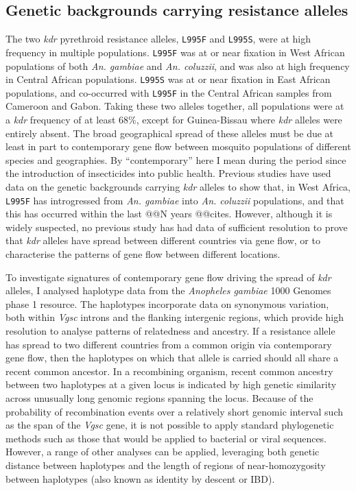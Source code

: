 \documentclass[a4paper,11pt,abstracton,hidelinks]{scrartcl}
\newcommand{\agam}{\textit{An. gambiae}\xspace}
\newcommand{\acol}{\textit{An. coluzzii}\xspace}
\newcommand{\vgsc}{\textit{Vgsc}\xspace}
\begin{document}
\subsection*{Genetic backgrounds carrying resistance alleles}


The two \textit{kdr} pyrethroid resistance alleles, \texttt{L995F} and \texttt{L995S}, were at high frequency in multiple populations.
%
\texttt{L995F} was at or near fixation in West African populations of both \agam and \acol, and was also at high frequency in Central African populations.
%
\texttt{L995S} was at or near fixation in East African populations, and co-occurred with \texttt{L995F} in the Central African samples from Cameroon and Gabon.
%
Taking these two alleles together, all populations were at a \textit{kdr} frequency of at least 68\%, except for Guinea-Bissau where \textit{kdr} alleles were entirely absent.
%
The broad geographical spread of these alleles must be due at least in part to contemporary gene flow between mosquito populations of different species and geographies.
%
By ``contemporary'' here I mean during the period since the introduction of insecticides into public health.
%
Previous studies have used data on the genetic backgrounds carrying \textit{kdr} alleles to show that, in West Africa, \texttt{L995F} has introgressed from \agam into \acol populations, and that this has occurred within the last @@N years @@cites.
%
However, although it is widely suspected, no previous study has had data of sufficient resolution to prove that \textit{kdr} alleles have spread between different countries via gene flow, or to characterise the patterns of gene flow between different locations.


To investigate signatures of contemporary gene flow driving the spread of \textit{kdr} alleles, I analysed haplotype data from the \textit{Anopheles gambiae} 1000 Genomes phase 1 resource.
%
The haplotypes incorporate data on synonymous variation, both within \vgsc introns and the flanking intergenic regions, which provide high resolution to analyse patterns of relatedness and ancestry.
%
If a resistance allele has spread to two different countries from a common origin via contemporary gene flow, then the haplotypes on which that allele is carried should all share a recent common ancestor.
%
In a recombining organism, recent common ancestry between two haplotypes at a given locus is indicated by high genetic similarity across unusually long genomic regions spanning the locus.
%
Because of the probability of recombination events over a relatively short genomic interval such as the span of the \vgsc gene, it is not possible to apply standard phylogenetic methods such as those that would be applied to bacterial or viral sequences.
%
However, a range of other analyses can be applied, leveraging both genetic distance between haplotypes and the length of regions of near-homozygosity between haplotypes (also known as identity by descent or IBD).
\end{document}
